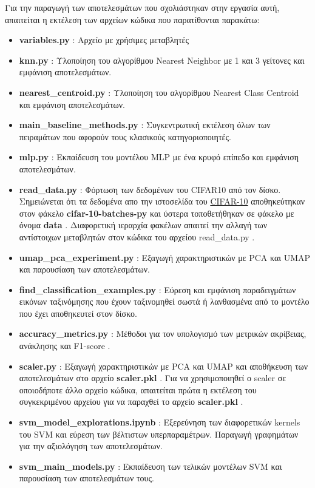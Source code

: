 \documentclass[a4paper,12pt]{article}
\newcommand{\lt}{\latintext}
\newcommand{\gt}{\greektext}
\begin{document}
Για την παραγωγή των αποτελεσμάτων που σχολιάστηκαν στην εργασία αυτή, απαιτείται η εκτέλεση των αρχείων κώδικα που παρατίθονται παρακάτω:
\begin{itemize}
    \item \lt \textbf{variables.py} \gt : Αρχείο με χρήσιμες μεταβλητές
    \item \lt \textbf{knn.py} \gt : Υλοποίηση του αλγορίθμου \lt Nearest Neighbor \gt με 1 και 3 γείτονες και εμφάνιση αποτελεσμάτων.
    \item \lt \textbf{nearest\_centroid.py} \gt : Υλοποίηση του αλγορίθμου \lt Nearest Class Centroid \gt και εμφάνιση αποτελεσμάτων.
    \item \lt \textbf{main\_baseline\_methods.py} \gt : Συγκεντρωτική εκτέλεση όλων των πειραμάτων που αφορούν τους κλασικούς κατηγοριοποιητές.
    \item \lt \textbf{mlp.py} \gt : Εκπαίδευση του μοντέλου \lt MLP \gt με ένα κρυφό επίπεδο και εμφάνιση αποτελεσμάτων.
    \item \lt \textbf{read\_data.py} \gt : Φόρτωση των δεδομένων του \lt CIFAR10 \gt από τον δίσκο. Σημειώνεται ότι τα δεδομένα απο την ιστοσελίδα του \lt \href{https://www.cs.toronto.edu/~kriz/cifar.html}{CIFAR-10} \gt 
    αποθηκεύτηκαν στον φάκελο \lt \textbf{cifar-10-batches-py} \gt και ύστερα τοποθετήθηκαν
    σε φάκελο με όνομα \lt \textbf{data} \gt. Διαφορετική ιεραρχία φακέλων απαιτεί την αλλαγή των αντίστοιχων μεταβλητών στον κώδικα του αρχείου \lt read\_data.py \gt.
    \item \lt \textbf{umap\_pca\_experiment.py} \gt : Εξαγωγή χαρακτηριστικών με \lt PCA \gt και \lt UMAP \gt και παρουσίαση των αποτελεσμάτων.
    \item \lt \textbf{find\_classification\_examples.py} \gt : Εύρεση και εμφάνιση παραδειγμάτων εικόνων ταξινόμησης που έχουν ταξινομηθεί σωστά ή λανθασμένα από το μοντέλο που έχει αποθηκευτεί στον δίσκο. 
    \item \lt \textbf{accuracy\_metrics.py} \gt : Μέθοδοι για τον υπολογισμό των μετρικών ακρίβειας, ανάκλησης και \lt F1-score \gt.
    \item \lt \textbf{scaler.py} \gt : Εξαγωγή χαρακτηριστικών με \lt PCA \gt και \lt UMAP \gt και αποθήκευση των αποτελεσμάτων στο αρχείο \lt \textbf{scaler.pkl} \gt. Για να χρησιμοποιηθεί ο 
    \lt scaler \gt σε οποιοδήποτε άλλο αρχείο κώδικα, απαιτείται πρώτα η εκτέλεση του συγκεκριμένου αρχείου για να παραχθεί το αρχείο \lt \textbf{scaler.pkl} \gt.
    \item \lt \textbf{svm\_model\_explorations.ipynb} \gt : Εξερεύνηση των διαφορετικών \lt kernels \gt του \lt SVM \gt και εύρεση των βέλτιστων υπερπαραμέτρων. 
    Παραγωγή γραφημάτων για την αξιολόγηση των αποτελεσμάτων.
    \item \lt \textbf{svm\_main\_models.py} \gt : Εκπαίδευση των τελικών μοντέλων \lt SVM \gt και παρουσίαση των αποτελεσμάτων τους.
\end{itemize}
\end{document}
